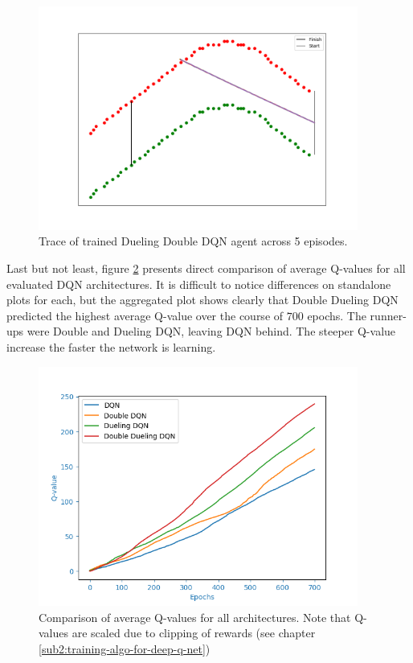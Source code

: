 \begin{figure}[h]
    \centering
    \includegraphics[width=10.5cm]{img/trace_double_ddqn.png}
    \caption{Trace of trained Dueling Double DQN agent across 5 episodes.}
    \label{fig:trace-dueling-double-dqn}
\end{figure}

Last but not least, figure \ref{fig:results-qval-comparison} presents direct comparison of average Q-values for all evaluated DQN architectures. It is difficult to notice differences on standalone plots for each, but the aggregated plot shows clearly that Double
Dueling DQN predicted the highest average Q-value over the course of $700$ epochs. The runner-ups were Double and Dueling DQN, leaving DQN behind. The steeper Q-value increase the faster the network is learning.

\begin{figure}[h]
    \centering
    \includegraphics[width=10.5cm]{img/cumulated_qval.png}
    \caption{Comparison of average Q-values for all architectures. Note that Q-values are scaled due to clipping of rewards (see chapter \ref{sub2:training-algo-for-deep-q-net})}
    \label{fig:results-qval-comparison}
\end{figure}
